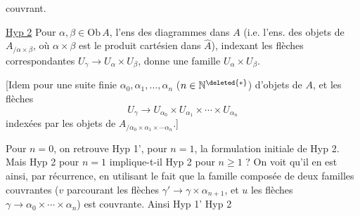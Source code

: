 
 couvrant.

\uline{Hyp 2} Pour $\alpha,\beta\in\mathrm{Ob}\,A$, l'ens des  diagrammes
\diagram{\begin{tikzcd}[ampersand replacement=\&,column sep=small,row sep=small]\&\alpha\\\gamma\arrow[ur]\arrow[dr]\&\\\&\beta\end{tikzcd}}
dans $A$ (i.e. l'ens. des objets de $A_{/\alpha\times\beta}$, où $\alpha\times\beta$ est le produit cartésien dans $\widehat A$), indexant les flèches correspondantes $U_\gamma\longrightarrow U_\alpha\times U_\beta$, donne une famille  $U_\alpha\times U_\beta$.

[Idem pour une suite finie  $\alpha_0,\alpha_1,\ldots,\alpha_n$ ($n\in\mathbb N^{\deleted{*}}$) d'objets de $A$, et les  flèches
\[U_\gamma\longrightarrow U_{\alpha_0}\times U_{\alpha_1}\times\cdots\times U_{\alpha_n}\]
indexées par les objets de $A_{/\alpha_0\times\alpha_1\times\cdots\alpha_n}$.]

Pour $n=0$, on retrouve Hyp 1', pour $n=1$, la formulation initiale de Hyp 2. Mais Hyp 2 pour $n=1$ implique-t-il Hyp 2 pour  $n\geq1$ ? On voit qu'il en est ainsi, par récurrence, en utilisant le fait que la famille composée de deux familles couvrantes
($v$ parcourant les flèches $\gamma'\longrightarrow\gamma\times\alpha_{n+1}$, et $u$ les flèches $\gamma\longrightarrow\alpha_0\times\cdots\times\alpha_n$) est couvrante. Ainsi Hyp 1'  \inserted{$+$} Hyp 2
